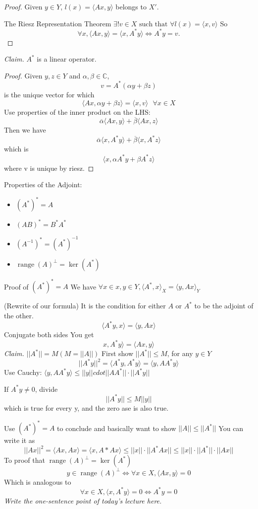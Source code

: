 \documentclass[11pt]{article}
\newcommand{\1}{\mathbf{1}}
\DeclareMathOperator{\range}{range}
\theoremstyle{notestyle}
\theoremstyle{definition}
\begin{document}
\begin{proof}
Given $y \in Y$, $l(x) = \langle Ax, y\rangle$ belongs to $X'.$ 
\par The Riesz Representation Theorem $\exists! v \in X \text{ such that } \forall l(x) =
\langle x, v\rangle$
So 
$$\forall x, \langle Ax, y \rangle = \langle x, A^*y\rangle \iff A^*y = v.$$
\end{proof}
\noindent\textit{Claim.} $A^*$ is a linear operator.
\begin{proof}
    Given $y, z \in Y$ and $\alpha, \beta \in \mathbb{C}$, $$v = A^{*}\left(\alpha y +
        \beta z\right) $$ is the unique vector for which $$\langle Ax, \alpha y + \beta
        z\rangle = \langle x, v\rangle  \text{ } \forall x \in X$$
        Use properties of the inner product on the LHS:
        $$\overline{\alpha}\langle Ax, y\rangle  + \overline{\beta}\langle Ax,
        z\rangle$$
        Then we have $$\overline{\alpha} \langle x, A^* y\rangle +
        \overline{\beta}\langle x, A^* z\rangle $$  which is $$\langle x, \alpha A^* y +
        \beta A^* z\rangle$$
        where v is unique by riesz.
\end{proof}
Properties of the Adjoint:
\begin{itemize}
    \item $(A^*)^* = A$
    \item $(AB)^* = B^*A^*$
    \item $(A^{-1})^{*} = (A^{*})^{-1}$
    \item $\range(A)^{\perp} = \ker(A^{*})$
\end{itemize}
Proof of $(A^*)^*=A$
We have $\forall x \in x, y\in Y, \langle A^*, x\rangle_X = \langle y, Ax \rangle_Y$
\par (Rewrite of our formula)
It is the condition for either $A$ or $A^{*}$ to be the adjoint of the other. 
$$\langle A^{*} y, x\rangle = \langle y, Ax \rangle$$
Conjugate both sides
You get $$x, A^{*} y \rangle = \langle Ax, y\rangle$$
\noindent\textit{Claim.} $||A^*|| = M (M = ||A||)$
First show $||A^{*}|| \le M$, for any $y \in Y$ 
$$||A^{*} y||^2 = \langle A^{*} y , A^{*} y \rangle = \langle y, AA^{*} y\rangle$$
Use Cauchy:
$\langle y, AA^{*}y\rangle \le ||y|| cdot ||AA^{*}|| \cdot ||A^{*} y||$
\par If $A^{*}y \ne 0$, divide 
$$||A^{*}y || \le M||y||$$
which is true for every y, and the zero ase is also true.
\par Use $(A^{*})^{*}= A$ to conclude and basically want to show $||A|| \le ||A^{*}||$
You can write it as $$||Ax||^2 = \langle Ax, Ax \rangle =\langle x, A* Ax\rangle \le
||x||\cdot ||A^{*}Ax || \le ||x|| \cdot ||A^{*}|| \cdot ||Ax||$$
To proof that $\range(A)^{\perp} = \ker(A^{*})$
$$y \in \range(A)^{\perp} \iff \forall x \in X, \langle Ax, y\rangle = 0$$
Which is analogous to $$\forall x \in X, \langle x, A^* y \rangle = 0 \iff A^{*}y = 0$$
\textit{Write the one-sentence point of today's lecture here.}
\end{document}
